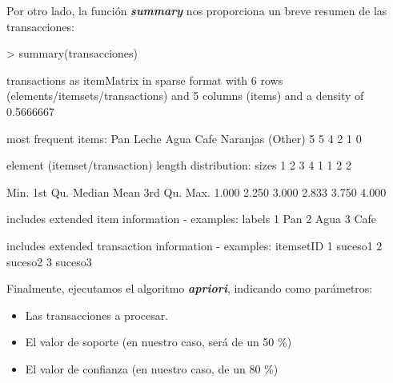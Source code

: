 \documentclass [a4paper] {article}
\begin{document}
Por otro lado, la función \textbf{\textit{summary}} nos proporciona un breve resumen de las transacciones:
\begin{Schunk}
\begin{Sinput}
> summary(transacciones)
\end{Sinput}
\begin{Soutput}
transactions as itemMatrix in sparse format with
 6 rows (elements/itemsets/transactions) and
 5 columns (items) and a density of 0.5666667 

most frequent items:
     Pan    Leche     Agua     Cafe Naranjas  (Other) 
       5        5        4        2        1        0 

element (itemset/transaction) length distribution:
sizes
1 2 3 4 
1 1 2 2 

   Min. 1st Qu.  Median    Mean 3rd Qu.    Max. 
  1.000   2.250   3.000   2.833   3.750   4.000 

includes extended item information - examples:
  labels
1    Pan
2   Agua
3   Cafe

includes extended transaction information - examples:
  itemsetID
1   suceso1
2   suceso2
3   suceso3
\end{Soutput}
\end{Schunk}
Finalmente, ejecutamos el algoritmo \textbf{\textit{apriori}}, indicando como parámetros:
\begin{itemize}
    \item Las transacciones a procesar.
    \item El valor de soporte (en nuestro caso, será de un 50 \%)
    \item El valor de confianza (en nuestro caso, de un 80 \%)
\end{itemize}
\end{document}
